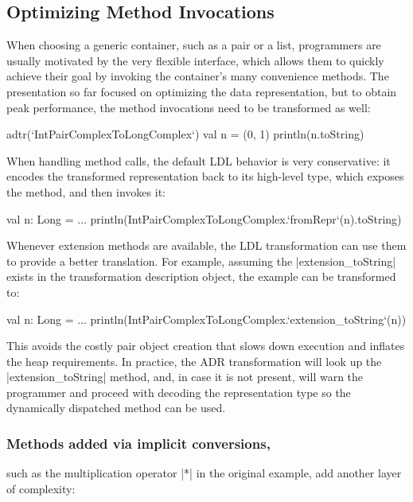 \subsection{Optimizing Method Invocations}
\label{sec:ildl:semantics}

When choosing a generic container, such as a pair or a list, programmers are usually motivated by the very flexible interface, which allows them to quickly achieve their goal by invoking the container's many convenience methods. The presentation so far focused on optimizing the data representation, but to obtain peak performance, the method invocations need to be transformed as well:

\begin{lstlisting-nobreak}
adtr(`IntPairComplexToLongComplex`) {
  val n = (0, 1)
  println(n.toString)
}
\end{lstlisting-nobreak}

When handling method calls, the default LDL behavior is very conservative: it encodes the transformed representation back to its high-level type, which exposes the method, and then invokes it:

\begin{lstlisting-nobreak}
val n: Long = ...
println(IntPairComplexToLongComplex.`fromRepr`(n).toString)
\end{lstlisting-nobreak}

Whenever extension methods are available, the LDL transformation can use them to provide a better translation. For example, assuming the |extension_toString| exists in the transformation description object, the example can be transformed to:

\begin{lstlisting-nobreak}
val n: Long = ...
println(IntPairComplexToLongComplex.`extension_toString`(n))
\end{lstlisting-nobreak}

This avoids the costly pair object creation that slows down execution and inflates the heap requirements. In practice, the ADR transformation will look up the |extension_toString| method, and, in case it is not present, will warn the programmer and proceed with decoding the representation type so the dynamically dispatched method can be used.

\subsubsection{Methods added via implicit conversions,} such as the multiplication operator |*| in the original example, add another layer of complexity:

